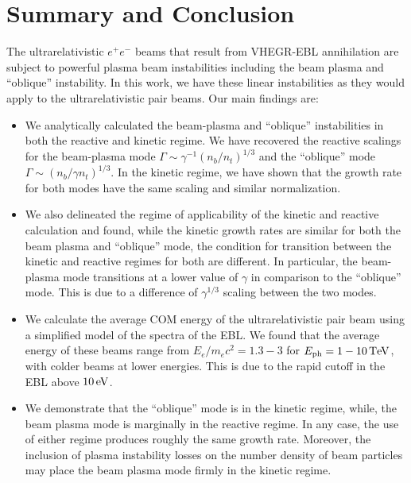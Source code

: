 \documentclass[usenatbib,iop,apj]{emulateapj}
\def\eV{{\rm eV}} %
\def\TeV{{\rm T}\eV} %
\newcommand{\epm}{\ensuremath{e^+e^-}}
\begin{document}
\section{Summary and Conclusion}\label{sec:conclusions}

The ultrarelativistic $\epm$ beams that result from VHEGR-EBL annihilation are subject to powerful plasma beam instabilities including the beam plasma and ``oblique'' instability.  In this work, we have these linear instabilities as they would apply to the ultrarelativistic pair beams.  Our main findings are:
\begin{itemize}
\item{We analytically calculated the beam-plasma and ``oblique'' instabilities in both the reactive and kinetic regime.  We have recovered the reactive scalings for the beam-plasma mode $\Gamma \sim \gamma^{-1}(n_b/n_t)^{1/3}$ and the ``oblique'' mode $\Gamma \sim (n_b/\gamma n_t)^{1/3}$.  In the kinetic regime, we have shown that the growth rate for both modes have the same scaling and similar normalization.}
\item{We also delineated the regime of applicability of the kinetic and reactive calculation and found, while the kinetic growth rates are similar for both the beam plasma and ``oblique'' mode, the condition for transition between the kinetic and reactive regimes for both are different.  In particular, the beam-plasma mode transitions at a lower value of $\gamma$ in comparison to the ``oblique'' mode.  This is due to a difference of $\gamma^{1/3}$ scaling between the two modes.}
\item{We calculate the average COM energy of the ultrarelativistic pair beam using a simplified model of the spectra of the EBL.  We found that the average energy of these beams range from $E_e/m_e c^2 = 1.3-3$ for $E_{\rm ph} = 1-10\,\TeV$, with colder beams at lower energies.  This is due to the rapid cutoff in the EBL above $10\,\eV$. }
\item{We demonstrate that the ``oblique'' mode is in the kinetic regime, while, the beam plasma mode is marginally in the reactive regime. In any case, the use of either regime produces roughly the same growth rate.  Moreover, the inclusion of plasma instability losses on the number density of beam particles may place the beam plasma mode firmly in the kinetic regime.}
\end{itemize}
\end{document}
